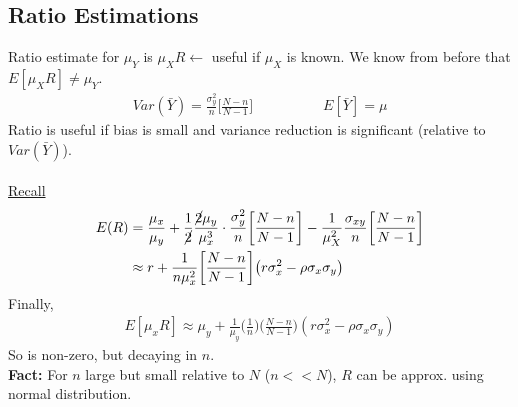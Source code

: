 \subsection*{Ratio Estimations}
Ratio estimate for $\mu_Y$ is $\mu_X R \leftarrow$ useful if $\mu_X$ is known. We know from before that $E[\mu_X R] \neq \mu_Y$.
\begin{gather*}
	Var(\bar{Y}) = \frac{\sigma_y^2}{n}\bigg[ \frac{N-n}{N-1} \bigg] \hspace{5em} E[\bar{Y}] = \mu 
\end{gather*}
Ratio is useful if bias is small and variance reduction is significant (relative to $Var(\bar{Y})$).\\\\
\underline{Recall}
\begin{align*}
	E(R) & = \frac{\mu_x}{\mu_y} + \frac{1}{\cancel{2}} \frac{\cancel{2} \mu_y}{\mu_x^3} \cdot \frac{\sigma_y^2}{n}\bigg[ \frac{N-n}{N-1} \bigg] - \frac{1}{\mu_X^2} \frac{\sigma_{xy}}{n}\bigg[ \frac{N-n}{N-1} \bigg]\\
	& \approx r + \frac{1}{n \mu_x^2} \bigg[ \frac{N-n}{N-1} \bigg] \big(r\sigma_x^2 - \rho \sigma_x \sigma_y \big)
\end{align*}
Finally,
\begin{align*}
	E[\mu_x R] \approx \mu_y + \frac{1}{\mu_y} \bigg(\frac{1}{n} \bigg) \bigg(\frac{N-n}{N-1} \bigg) (r \sigma_x^2 - \rho \sigma_x \sigma_y)
\end{align*}
So is non-zero, but decaying in $n$.\\ \textbf{Fact: } For $n$ large but small relative to $N$ ($n << N$), $R$ can be approx. using normal distribution.